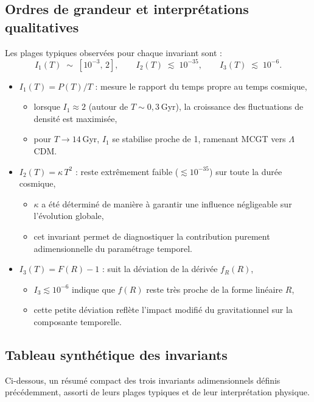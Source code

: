 \subsection{Ordres de grandeur et interprétations qualitatives}
Les plages typiques observées pour chaque invariant sont :
\[
  I_{1}(T)\;\sim\;[10^{-3},\,2], 
  \qquad
  I_{2}(T)\;\lesssim\;10^{-35}, 
  \qquad
  I_{3}(T)\;\lesssim\;10^{-6}.
\]
\begin{itemize}
  \item \textbf{$I_{1}(T) = P(T)/T$} : mesure le rapport du temps propre au temps cosmique,  
    \begin{itemize}
      \item lorsque $I_{1}\approx 2$ (autour de $T\sim0{,}3$ Gyr), la croissance des fluctuations de densité est maximisée,  
      \item pour $T\to 14$ Gyr, $I_{1}$ se stabilise proche de 1, ramenant MCGT vers $\Lambda$CDM.  
    \end{itemize}
  \item \textbf{$I_{2}(T) = \kappa\,T^{2}$} : reste extrêmement faible ($\lesssim10^{-35}$) sur toute la durée cosmique,  
    \begin{itemize}
      \item $\kappa$ a été déterminé de manière à garantir une influence négligeable sur l’évolution globale,  
      \item cet invariant permet de diagnostiquer la contribution purement adimensionnelle du paramétrage temporel.  
    \end{itemize}
  \item \textbf{$I_{3}(T) = F(R) - 1$} : suit la déviation de la dérivée $f_{R}(R)$,  
    \begin{itemize}
      \item $I_{3}\lesssim10^{-6}$ indique que $f(R)$ reste très proche de la forme linéaire $R$,  
      \item cette petite déviation reflète l’impact modifié du gravitationnel sur la composante temporelle.  
    \end{itemize}
\end{itemize}

\subsection{Tableau synthétique des invariants}

Ci-dessous, un résumé compact des trois invariants adimensionnels définis précédemment, assorti de leurs plages typiques et de leur interprétation physique.

